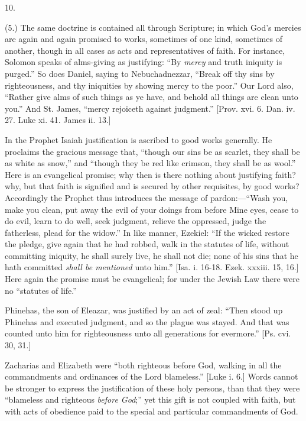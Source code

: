 10.

(5.) The same doctrine is contained all through Scripture; in which
God's mercies are again and again promised to works, sometimes of one
kind, sometimes of another, though in all cases as acts and
representatives of faith. For instance, Solomon speaks of alms-giving
as justifying: ``By \emph{mercy} and truth iniquity is
purged.'' So does Daniel, saying to Nebuchadnezzar, ``Break
off thy sins by righteousness, and thy iniquities by showing mercy to
the poor.'' Our Lord also, ``Rather give alms of such things
as ye have, and behold all things are clean unto you.'' And
St. James, ``mercy rejoiceth against judgment.'' [Prov. xvi.
6. Dan. iv. 27. Luke xi. 41. James ii. 13.]

In the Prophet Isaiah justification is ascribed to good works
generally. He proclaims the gracious message that, ``though our
sins be as scarlet, they shall be as white as snow,'' and
``though they be red like crimson, they shall be as wool.''
Here is an evangelical promise; why then is there nothing about
justifying faith? why, but that faith is signified and is secured by
other requisites, by good works? Accordingly the Prophet thus
introduces the message of pardon:—``Wash you, make you clean,
put away the evil of your doings from before Mine eyes, cease to do
evil, learn to do well, seek judgment, relieve the oppressed, judge
the fatherless, plead for the widow.'' In like manner, Ezekiel:
``If the wicked restore the pledge, give again that he had robbed,
walk in the statutes of life, without committing iniquity, he shall
surely live, he shall not die; none of his sins that he hath committed
\emph{shall be mentioned} unto him.'' [Isa. i. 16-18. Ezek. xxxiii.
15, 16.] Here again the promise must be evangelical; for under the
Jewish Law there were no ``statutes of life.''

Phinehas, the son of Eleazar, was justified by an act of zeal:
``Then stood up Phinehas and executed judgment, and so the plague
was stayed. And that was counted unto him for righteousness unto all
generations for evermore.'' [Ps. cvi. 30, 31.]

Zacharias and Elizabeth were ``both righteous before God,
walking in all the commandments and ordinances of the Lord
blameless.'' [Luke i. 6.] Words cannot be stronger to express the
justification of these holy persons, than that they were
``blameless and righteous \emph{before God};'' yet this gift
is not coupled with faith, but with acts of obedience paid to the
special and particular commandments of God.

